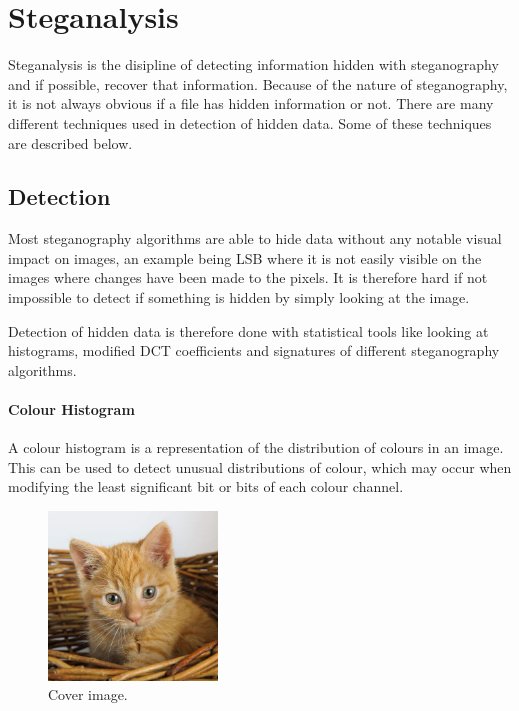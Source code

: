 \section{Steganalysis}
\label{steganalysis}
Steganalysis is the disipline of detecting information hidden with steganography and if possible, recover that information.
Because of the nature of steganography, it is not always obvious if a file has hidden information or not.
There are many different techniques used in detection of hidden data.
Some of these techniques are described below.


\subsection{Detection}
\label{Detection}
Most steganography algorithms are able to hide data without any notable visual impact on images, an example being LSB where it is not easily visible on the images where changes have been made to the pixels.
It is therefore hard if not impossible to detect if something is hidden by simply looking at the image.

Detection of hidden data is therefore done with statistical tools like looking at histograms, modified DCT coefficients and signatures of different steganography algorithms.

\paragraph*{Colour Histogram}
A colour histogram is a representation of the distribution of colours in an image. 
This can be used to detect unusual distributions of colour, which may occur when modifying the least significant bit or bits of each colour channel.

\begin{figure}
	\centering
	\includegraphics[width=0.4\textwidth]{figures/cover.jpg}
	\caption{Cover image. \citep{imgCover}}
	\label{fig:CoverImage}
\end{figure}

